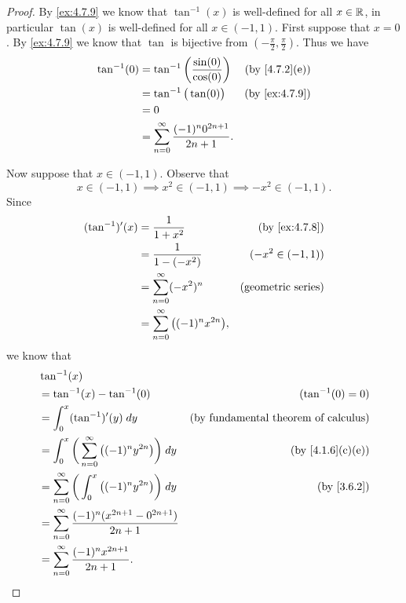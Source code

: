 \begin{proof}
  By \cref{ex:4.7.9} we know that \(\tan^{-1}(x)\) is well-defined for all \(x \in \mathbb{R}\), in particular \(\tan(x)\) is well-defined for all \(x \in (-1, 1)\).
  First suppose that \(x = 0\).
  By \cref{ex:4.7.9} we know that \(\tan\) is bijective from \((-\frac{\pi}{2}, \frac{\pi}{2})\).
  Thus we have
  \begin{align*}
    \tan^{-1}(0) & = \tan^{-1}\bigg(\frac{\sin(0)}{\cos(0)}\bigg)          & \text{(by \cref{4.7.2}(e))} \\
                 & = \tan^{-1}\big(\tan(0)\big)                            & \text{(by \cref{ex:4.7.9})} \\
                 & = 0                                                                                   \\
                 & = \sum_{n = 0}^\infty \frac{(-1)^n 0^{2n + 1}}{2n + 1}.
  \end{align*}

  Now suppose that \(x \in (-1, 1)\).
  Observe that
  \[
    x \in (-1, 1) \implies x^2 \in (-1, 1) \implies -x^2 \in (-1, 1).
  \]
  Since
  \begin{align*}
    (\tan^{-1})'(x) & = \frac{1}{1 + x^2}                            & \text{(by \cref{ex:4.7.8})} \\
                    & = \frac{1}{1 - (-x^2)}                         & (-x^2 \in (-1, 1))          \\
                    & = \sum_{n = 0}^\infty (-x^2)^n                 & \text{(geometric series)}   \\
                    & = \sum_{n = 0}^\infty \big((-1)^n x^{2n}\big),
  \end{align*}
  we know that
  \begin{align*}
     & \tan^{-1}(x)                                                                                                             \\
     & = \tan^{-1}(x) - \tan^{-1}(0)                                              & (\tan^{-1}(0) = 0)                          \\
     & = \int_0^x (\tan^{-1})'(y) \; dy                                           & \text{(by fundamental theorem of calculus)} \\
     & = \int_{0}^x \bigg(\sum_{n = 0}^\infty \big((-1)^n y^{2n}\big)\bigg) \; dy & \text{(by \cref{4.1.6}(c)(e))}              \\
     & = \sum_{n = 0}^\infty \bigg(\int_{0}^x \big((-1)^n y^{2n}\big)\bigg) \; dy & \text{(by \cref{3.6.2})}                    \\
     & = \sum_{n = 0}^\infty \frac{(-1)^n (x^{2n + 1} - 0^{2n + 1})}{2n + 1}                                                    \\
     & = \sum_{n = 0}^\infty \frac{(-1)^n x^{2n + 1}}{2n + 1}.
  \end{align*}


\end{proof}
